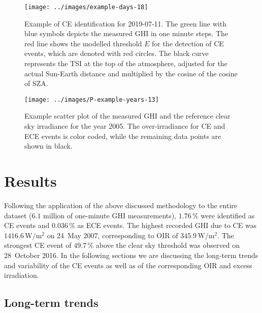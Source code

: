 \documentclass[preprint, 5p,
authoryear]{elsarticle} %
\begin{document}
\begin{figure}[H]

{\centering \texttt{[image: ../images/example-days-18]} 

}

\caption{Example of CE identification for 2019-07-11. The green line with blue symbols depicts the measured GHI in one minute steps. The red line shows the modelled threshold $E$ for the detection of CE events, which are denoted with red circles. The black curve represents the TSI at the top of the atmosphere, adjusted for the actual Sun-Earth distance and multiplied by the cosine of the cosine of SZA.}\label{fig:example-day}
\end{figure}

\begin{figure}[H]

{\centering \texttt{[image: ../images/P-example-years-13]} 

}

\caption{Example scatter plot of the measured GHI and the reference clear sky irradiance for the year 2005. The over-irradiance for CE and ECE events is color coded, while the remaining data points are shown in black.}\label{fig:example-year}
\end{figure}

\hypertarget{results}{%
\section{Results}\label{results}}

Following the application of the above discussed methodology to the
entire dataset (\(6.1\) million of one-minute GHI measurements),
\(1.76\,\%\) were identified as CE events and \(0.036\,\%\) as ECE
events. The highest recorded GHI due to CE was
\(1416.6\,\text{W}/\text{m}^2\) on 24~May 2007, corresponding to OIR of
\(345.9\,\text{W}/\text{m}^2\). The strongest CE event of \(49.7\,\%\)
above the clear sky threshold was observed on 28~October 2016. In the
following sections we are discussing the long-term trends and
variability of the CE events as well as of the corresponding OIR and
excess irradiation.

\hypertarget{long-term-trends}{%
\subsection{Long-term trends}\label{long-term-trends}}
\end{document}
